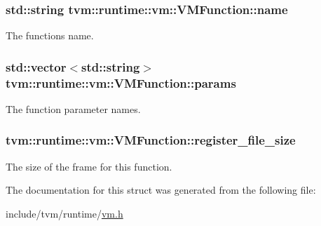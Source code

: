 \subsubsection[{\texorpdfstring{name}{name}}]{\setlength{\rightskip}{0pt plus 5cm}std\+::string tvm\+::runtime\+::vm\+::\+V\+M\+Function\+::name}\hypertarget{structtvm_1_1runtime_1_1vm_1_1VMFunction_ae2f6bf699f51fb33d1659d88ff6855e0}{}\label{structtvm_1_1runtime_1_1vm_1_1VMFunction_ae2f6bf699f51fb33d1659d88ff6855e0}


The function\textquotesingle{}s name. 

\subsubsection[{\texorpdfstring{params}{params}}]{\setlength{\rightskip}{0pt plus 5cm}std\+::vector$<$std\+::string$>$ tvm\+::runtime\+::vm\+::\+V\+M\+Function\+::params}\hypertarget{structtvm_1_1runtime_1_1vm_1_1VMFunction_a6d480483112097888c71501504665693}{}\label{structtvm_1_1runtime_1_1vm_1_1VMFunction_a6d480483112097888c71501504665693}


The function parameter names. 

\subsubsection[{\texorpdfstring{register\+\_\+file\+\_\+size}{register_file_size}}]{ tvm\+::runtime\+::vm\+::\+V\+M\+Function\+::register\+\_\+file\+\_\+size}\hypertarget{structtvm_1_1runtime_1_1vm_1_1VMFunction_a5b910095e5c2826cf57793afb4f2078a}{}\label{structtvm_1_1runtime_1_1vm_1_1VMFunction_a5b910095e5c2826cf57793afb4f2078a}


The size of the frame for this function. 



The documentation for this struct was generated from the following file\+:\begin{DoxyCompactItemize}
\item 
include/tvm/runtime/\hyperlink{vm_8h}{vm.\+h}\end{DoxyCompactItemize}

